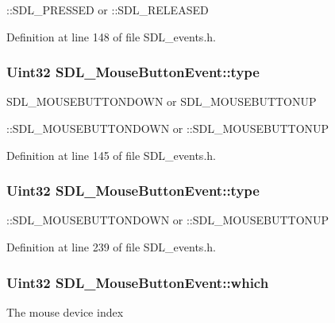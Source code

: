 \+::\+S\+D\+L\+\_\+\+P\+R\+E\+S\+S\+E\+D or \+::\+S\+D\+L\+\_\+\+R\+E\+L\+E\+A\+S\+E\+D 

Definition at line 148 of file S\+D\+L\+\_\+events.\+h.

\hypertarget{structSDL__MouseButtonEvent_af64cb09ea68b8081ecc8ee498552e3d7}{
\subsubsection[{type}]{\setlength{\rightskip}{0pt plus 5cm}Uint32 S\+D\+L\+\_\+\+Mouse\+Button\+Event\+::type}}\label{structSDL__MouseButtonEvent_af64cb09ea68b8081ecc8ee498552e3d7}
S\+D\+L\+\_\+\+M\+O\+U\+S\+E\+B\+U\+T\+T\+O\+N\+D\+O\+W\+N or S\+D\+L\+\_\+\+M\+O\+U\+S\+E\+B\+U\+T\+T\+O\+N\+U\+P

\+::\+S\+D\+L\+\_\+\+M\+O\+U\+S\+E\+B\+U\+T\+T\+O\+N\+D\+O\+W\+N or \+::\+S\+D\+L\+\_\+\+M\+O\+U\+S\+E\+B\+U\+T\+T\+O\+N\+U\+P 

Definition at line 145 of file S\+D\+L\+\_\+events.\+h.

\hypertarget{structSDL__MouseButtonEvent_af64cb09ea68b8081ecc8ee498552e3d7}{
\subsubsection[{type}]{\setlength{\rightskip}{0pt plus 5cm}Uint32 S\+D\+L\+\_\+\+Mouse\+Button\+Event\+::type}}\label{structSDL__MouseButtonEvent_af64cb09ea68b8081ecc8ee498552e3d7}
\+::\+S\+D\+L\+\_\+\+M\+O\+U\+S\+E\+B\+U\+T\+T\+O\+N\+D\+O\+W\+N or \+::\+S\+D\+L\+\_\+\+M\+O\+U\+S\+E\+B\+U\+T\+T\+O\+N\+U\+P 

Definition at line 239 of file S\+D\+L\+\_\+events.\+h.

\hypertarget{structSDL__MouseButtonEvent_a366aef59a0f393afc8a3561e741825df}{
\subsubsection[{which}]{\setlength{\rightskip}{0pt plus 5cm}Uint32 S\+D\+L\+\_\+\+Mouse\+Button\+Event\+::which}}\label{structSDL__MouseButtonEvent_a366aef59a0f393afc8a3561e741825df}
The mouse device index

